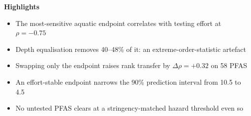 \documentclass[11pt]{article}
\begin{document}
\noindent\textbf{Highlights}
\begin{itemize}\itemsep2pt
\item The most-sensitive aquatic endpoint correlates with testing effort at $\rho=-0.75$
\item Depth equalisation removes 40--48\% of it: an extreme-order-statistic artefact
\item Swapping only the endpoint raises rank transfer by $\Delta\rho=+0.32$ on 58 PFAS
\item An effort-stable endpoint narrows the 90\% prediction interval from 10.5 to 4.5
\item No untested PFAS clears at a stringency-matched hazard threshold even so
\end{itemize}
\end{document}

